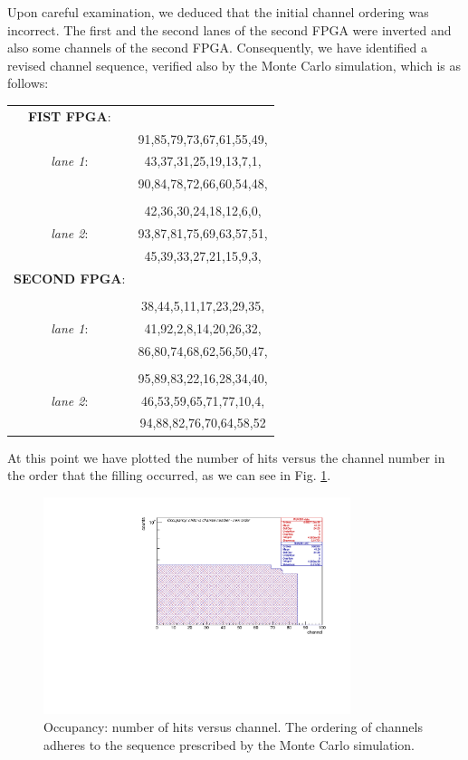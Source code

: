 \documentclass[12pt]{article}
\begin{document}
Upon careful examination, we deduced that the initial channel ordering was incorrect. 
The first and the second lanes of the second FPGA were inverted and also some channels of the second FPGA.
Consequently, we have identified a revised channel sequence, verified also by the Monte Carlo simulation, which is as follows:
\begin{center}
\begin{tabular}{cc}
\textbf{FIST FPGA}: & \\
&91,85,79,73,67,61,55,49,\\
\textit{lane 1}: &43,37,31,25,19,13,7,1,\\
&90,84,78,72,66,60,54,48,\\
& \\
&42,36,30,24,18,12,6,0,\\
\textit{lane 2}: &93,87,81,75,69,63,57,51,\\
&45,39,33,27,21,15,9,3,\\
\textbf{SECOND FPGA}:&\\
&\\
&38,44,5,11,17,23,29,35,\\
\textit{lane 1}:&41,92,2,8,14,20,26,32,\\
&86,80,74,68,62,56,50,47,\\
 & \\
&95,89,83,22,16,28,34,40,\\
\textit{lane 2}:&46,53,59,65,71,77,10,4,\\
&94,88,82,76,70,64,58,52\\
\end{tabular}
\end{center}   
At this point we have plotted the number of hits versus the channel number in the order that the filling occurred, as we can see in Fig. \ref{fig:2}.
\begin{figure}[!h]
\centering
\includegraphics[width =0.8\textwidth]{pdf/figure_00004_nhitsvschannel_roc_simulation_2}
\caption{Occupancy: number of hits versus channel. The ordering of channels adheres to the sequence prescribed by the Monte Carlo simulation.}
\label{fig:2}
\end{figure}
\end{document}
